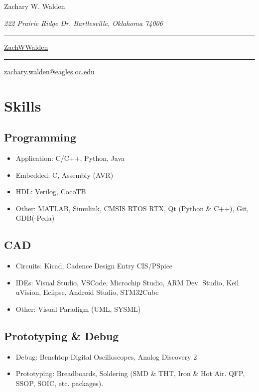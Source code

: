 \documentclass{article}
\newcommand\mybar{\kern1pt\rule[-\dp\strutbox]{.8pt}{\baselineskip}\kern1pt}
\begin{document}
\begin{center}
	\begin{Huge}
		Zachary W. Walden\\
	\end{Huge}
	\begin{large}
		\textsl{222 Prairie Ridge Dr. Bartlesville, Oklahoma 74006}\\
	\end{large}
	\begin{small}
		 \mybar { } \faGithub \href{https://github.com/ZachWWalden}{ ZachWWalden}
		\mybar { }\faEnvelope\href{mailto::zachary.walden@eagles.oc.edu}{ zachary.walden@eagles.oc.edu}
	\end{small}
\end{center}
\section{Skills}
	\subsection{Programming}
		\begin{itemize}
			\item Application: C/C++, Python, Java
			\item Embedded: C, Assembly (AVR)
			\item HDL: Verilog, CocoTB
			\item Other: MATLAB, Simulink, CMSIS RTOS RTX, Qt (Python \& C++), Git, GDB(-Peda)
		\end{itemize}
	\subsection{CAD}
		\begin{itemize}
			\item Circuits: Kicad, Cadence Design Entry CIS/PSpice
			\item IDEs: Visual Studio, VSCode, Microchip Studio, ARM Dev. Studio, Keil uVision, Eclipse, Android Studio, STM32Cube
			\item Other: Visual Paradigm (UML, SYSML)
		\end{itemize}
	\subsection{Prototyping \& Debug}
		\begin{itemize}
			\item Debug: Benchtop Digital Oscilloscopes, Analog Discovery 2
			\item Prototyping: Breadboards, Soldering (SMD \& THT, Iron \& Hot Air. QFP, SSOP, SOIC, etc. packages).
		\end{itemize}
\end{document}
